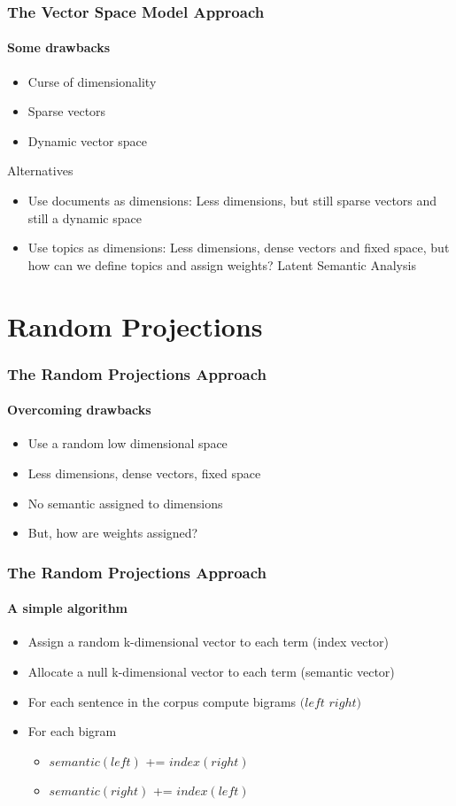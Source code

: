 \documentclass{beamer}
\begin{document}
\begin{frame}
	\frametitle{The Vector Space Model Approach}
	\framesubtitle{Some drawbacks}
  \begin{itemize}
    \item	Curse of dimensionality
    \item	Sparse vectors
    \item	Dynamic vector space
      \end{itemize}
      \bigskip
      Alternatives
  \begin{itemize}
    \item	Use documents as dimensions: Less dimensions, but still sparse vectors and still a dynamic space
    \item	Use topics as dimensions: Less dimensions, dense vectors and fixed space, but how can we define topics and assign weights?  Latent Semantic Analysis
  \end{itemize}
\end{frame}

\section{Random Projections}

\begin{frame}
	\frametitle{The Random Projections Approach}
	\framesubtitle{Overcoming drawbacks}
	\begin{itemize}
	\item Use a random low dimensional space
	\item Less dimensions, dense vectors, fixed space
	\item No semantic assigned to dimensions
	\item But, how are weights assigned?
	\end{itemize}
\end{frame}

\begin{frame}
	\frametitle{The Random Projections Approach}
	\framesubtitle{A simple algorithm }
	\begin{itemize}
		\item Assign a random k-dimensional vector to each term (index vector)
		\item Allocate a null k-dimensional vector to each term (semantic vector)
		\item For each sentence in the corpus compute bigrams $(left$ $right)$
		\item For each bigram 
		\begin{itemize}
		  \item $semantic(left)$ += $index(right)$
		  \item $semantic(right)$ += $index(left)$
		\end{itemize}
	\end{itemize}
\end{frame}	
\end{document}
